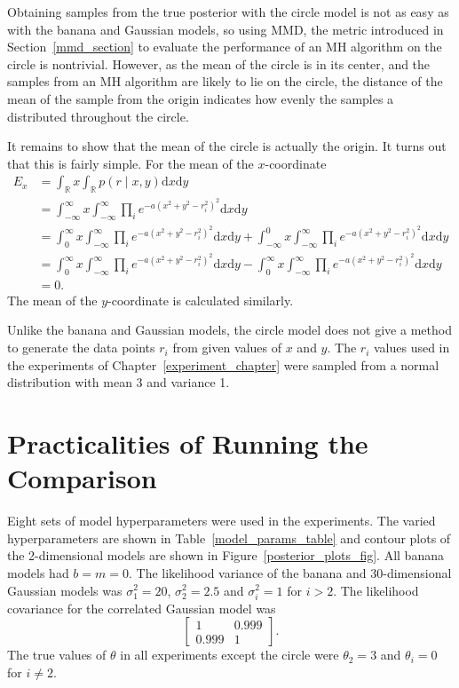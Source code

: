 \documentclass[english,twoside,openright]{HYgraduMLDS}
\newcommand{\R}{\mathbb{R}}
\newcommand{\dx}{\mathrm{d}}
\begin{document}
Obtaining samples from the true posterior with the circle model is not
as easy as with the banana and Gaussian models, so using MMD, the metric
introduced in Section~\ref{mmd_section} to evaluate
the performance of an MH algorithm on the circle is nontrivial. However,
as the mean of the circle is in its center, and the samples from an MH
algorithm are likely to lie on the circle, the distance of the mean of the
sample from the origin indicates how evenly the samples a distributed throughout
the circle.

It remains to show that the mean of the circle is actually the origin. It turns
out that this is fairly simple. For the mean of the \(x\)-coordinate
\begin{align*}
  E_{x} &= \int_{\R} x\int_{\R} p(r\mid x, y)\dx x\dx y
  \\&= \int_{-\infty}^{\infty} x\int_{-\infty}^{\infty}
  \prod_{i} e^{-a(x^{2} + y^{2} - r_{i}^{2})^{2}}\dx x\dx y
  \\&= \int_{0}^{\infty} x\int_{-\infty}^{\infty}
  \prod_{i} e^{-a(x^{2} + y^{2} - r_{i}^{2})^{2}}\dx x\dx y
  + \int_{-\infty}^{0}x\int_{-\infty}^{\infty}
  \prod_{i} e^{-a(x^{2} + y^{2} - r_{i}^{2})^{2}}\dx x\dx y
  \\&= \int_{0}^{\infty} x\int_{-\infty}^{\infty}
  \prod_{i} e^{-a(x^{2} + y^{2} - r_{i}^{2})^{2}}\dx x\dx y
  - \int_{0}^{\infty} x\int_{-\infty}^{\infty}
  \prod_{i} e^{-a(x^{2} + y^{2} - r_{i}^{2})^{2}}\dx x\dx y
  \\&= 0.
\end{align*}
The mean of the \(y\)-coordinate is calculated similarly.

Unlike the banana and Gaussian models,
the circle model does not give a method to generate the data points
\(r_{i}\) from given values of \(x\) and \(y\). The \(r_{i}\) values used
in the experiments of Chapter~\ref{experiment_chapter} were sampled
from a normal distribution with mean 3 and variance 1.

\section{Practicalities of Running the Comparison}\label{practical_section}

Eight sets of model hyperparameters were used in the experiments.
The varied hyperparameters are shown in
Table~\ref{model_params_table} and contour plots of the
2-dimensional models are shown in Figure~\ref{posterior_plots_fig}.
All banana models had \(b = m = 0\). The likelihood variance of the banana
and 30-dimensional Gaussian
models was \(\sigma_{1}^{2} = 20\), \(\sigma_{2}^{2} = 2.5\) and
\(\sigma_{i}^{2} = 1\)
for \(i > 2\). The likelihood covariance for the correlated Gaussian model
was
\[
\begin{bmatrix}
  1 & 0.999 \\
  0.999 & 1
\end{bmatrix}.
\]
The true values of \(\theta\) in all experiments except the circle were
\(\theta_{2} = 3\) and \(\theta_{i} = 0\) for \(i \neq 2\).
\end{document}
